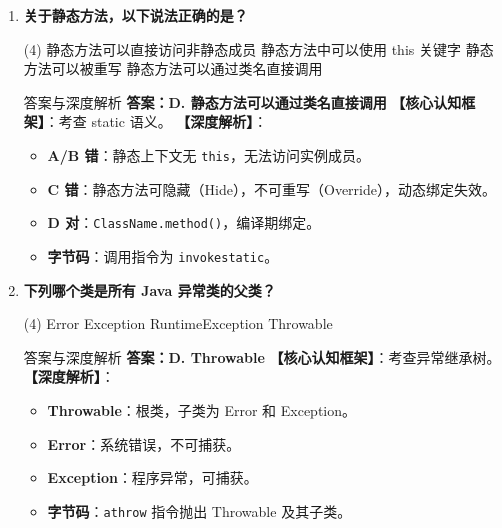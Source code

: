 \documentclass[12pt, a4paper]{ctexart}
\newcommand{\code}[1]{\texttt{#1}}
\begin{document}
\begin{enumerate}[label=\textbf{\arabic*.}, leftmargin=*, itemsep=1.5em]
\item \textbf{关于静态方法，以下说法正确的是？}
\begin{tasks}(4)
    \task 静态方法可以直接访问非静态成员 \task 静态方法中可以使用 this 关键字
    \task 静态方法可以被重写 \task 静态方法可以通过类名直接调用
\end{tasks}
\begin{bluebox}{答案与深度解析}
\textbf{答案：D. 静态方法可以通过类名直接调用}
\textbf{【核心认知框架】}：考查 static 语义。
\textbf{【深度解析】}：
\begin{itemize}[leftmargin=*, nosep]
    \item \textbf{A/B 错}：静态上下文无 \code{this}，无法访问实例成员。
    \item \textbf{C 错}：静态方法可隐藏（Hide），不可重写（Override），动态绑定失效。
    \item \textbf{D 对}：\code{ClassName.method()}，编译期绑定。
    \item \textbf{字节码}：调用指令为 \code{invokestatic}。
\end{itemize}
\end{bluebox}

\item \textbf{下列哪个类是所有 Java 异常类的父类？}
\begin{tasks}(4)
    \task Error \task Exception \task RuntimeException \task Throwable
\end{tasks}
\begin{bluebox}{答案与深度解析}
\textbf{答案：D. Throwable}
\textbf{【核心认知框架】}：考查异常继承树。
\textbf{【深度解析】}：
\begin{itemize}[leftmargin=*, nosep]
    \item \textbf{Throwable}：根类，子类为 Error 和 Exception。
    \item \textbf{Error}：系统错误，不可捕获。
    \item \textbf{Exception}：程序异常，可捕获。
    \item \textbf{字节码}：\code{athrow} 指令抛出 Throwable 及其子类。
\end{itemize}
\end{bluebox}


\end{enumerate}
\end{document}
